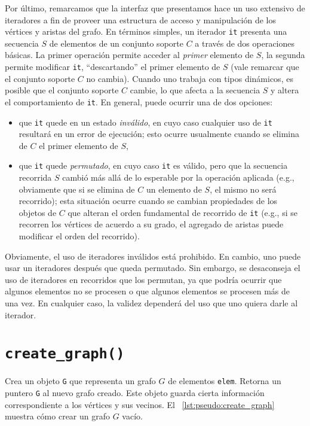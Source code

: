 \documentclass[%
    a4paper,%
    fontsize=12pt,%
    DIV=12,
    twoside,%
    openright,%
    titlepage=true,%
    headsepline,%
    toc=bibliography,%
    parskip=half,%
    cleardoublepage=empty,%
    headings=big,%
]{scrbook}
\makeatletter
\newcommand{\Code}[1]{\lstinline[basicstyle={\ttfamily}]@#1@}
\makeatother
\begin{document}
Por último, remarcamos que la interfaz que presentamos hace un uso extensivo de iteradores a fin de proveer una estructura de acceso y manipulación de los vértices y aristas del grafo.  En términos simples, un iterador \Code{it} presenta una secuencia $S$ de elementos de un conjunto soporte $C$ a través de dos operaciones básicas.  La primer operación permite acceder al \emph{primer} elemento de $S$, la segunda permite modificar \Code{it}, ``descartando'' el primer elemento de $S$ (vale remarcar que el conjunto soporte $C$ no cambia).  Cuando uno trabaja con tipos dinámicos, es posible que el conjunto  soporte $C$ cambie, lo que afecta a la secuencia $S$ y altera el comportamiento de \Code{it}.  En general, puede ocurrir una de dos opciones:
\begin{itemize}
  \item que \Code{it} quede en un estado \emph{inválido}, en cuyo caso cualquier uso de \Code{it} resultará en un error de ejecución; esto ocurre usualmente cuando se elimina de $C$ el primer elemento de $S$,
  \item que \Code{it} quede \emph{permutado}, en cuyo caso \Code{it} es válido, pero que la secuencia recorrida $S$ cambió más allá de lo esperable por la operación aplicada (e.g., obviamente que si se elimina de $C$ un elemento de $S$, el mismo no será recorrido); esta situación ocurre cuando se cambian propiedades de los objetos de $C$ que alteran el orden fundamental de recorrido de \Code{it} (e.g., si se recorren los vértices de acuerdo a su grado, el agregado de aristas puede modificar el orden del recorrido).  
\end{itemize}
Obviamente, el uso de iteradores inválidos está prohibido.  En cambio, uno puede usar un iteradores después que queda permutado.  Sin embargo, se desaconseja el uso de iteradores en recorridos que los permutan, ya que podría ocurrir que algunos elementos no se procesen o que algunos elementos se procesen más de una vez.  En cualquier caso, la validez dependerá del uso que uno quiera darle al iterador.

\section{\texorpdfstring{\Code{create_graph()}}{create\_graph()}}
\label{sec:tad grafo:create-graph}

Crea un objeto \Code{G} que representa un grafo $G$ de elementos \Code{elem}. Retorna un puntero \Code{G} al nuevo grafo creado. Este objeto guarda cierta información correspondiente a los vértices y sus vecinos. El \lstlistingname~\ref{lst:pseudo:create_graph} muestra cómo crear un grafo $G$ vacío.
\end{document}
